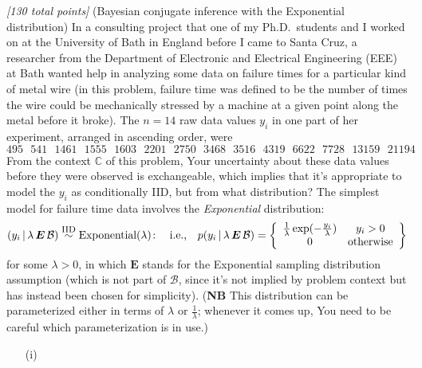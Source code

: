 \documentclass[12pt]{article}
\newcommand{\given}{\, | \,}
\begin{document}
\begin{itemize}
\textit{[130 total points]} (Bayesian conjugate inference with the Exponential distribution) In a consulting project that one of my Ph.D.~students and I worked on at the University of Bath in England before I came to Santa Cruz, a researcher from the Department of Electronic and Electrical Engineering (EEE) at Bath wanted help in analyzing some data on failure times for a particular kind of metal wire (in this problem, failure time was defined to be the number of times the wire could be mechanically stressed by a machine at a given point along the metal before it broke). The $n = 14$ raw data values $y_i$ in one part of her experiment, arranged in ascending order, were 
\[ 
495 \ \ \ 541 \ \ \ 1461 \ \ \ 1555 \ \ \ 1603 \ \ \ 2201 \ \ \ 2750 \ \ \
3468 \ \ \ 3516 \ \ \ 4319 \ \ \ 6622 \ \ \ 7728 \ \ \ 13159 \ \ \ 21194 
\] 
From the context $\mathbb{ C }$ of this problem, Your uncertainty about these data values before they were observed is exchangeable, which implies that it's appropriate to model the $y_i$ as conditionally IID, but from what distribution?
The simplest model for failure time data involves the \textit{Exponential} distribution: 
\begin{equation} \label{e:exponential-model-1}
( y_i \given \lambda \, \bm{ E } \, \mathcal{ B } ) \stackrel{ \mbox{\footnotesize IID} }{ \sim } \textrm{Exponential} ( \lambda ) \! : \ \ \ \textrm{i.e.,} \ \ \ p( y_i \given \lambda \, \bm{ E } \, \mathcal{ B } ) = \left\{ \begin{array}{cc} \frac{ 1 }{ \lambda } \exp( - \frac{
y_i }{ \lambda } ) & y_i > 0 \\ 0 & \mbox{otherwise} \end{array} \right\}
\end{equation}
for some $\lambda > 0$, in which $\bm{ E }$ stands for the Exponential sampling distribution assumption (which is not part of $\mathcal{ B }$, since it's not implied by problem context but has instead been chosen for simplicity). (\textbf{NB} This distribution can be parameterized either in terms of $\lambda$ or $\frac{ 1 }{ \lambda }$; whenever it comes up, You need to be careful which parameterization is in use.)

\begin{itemize}

\item[(i)]


\end{itemize}
\end{itemize}
\end{document}
